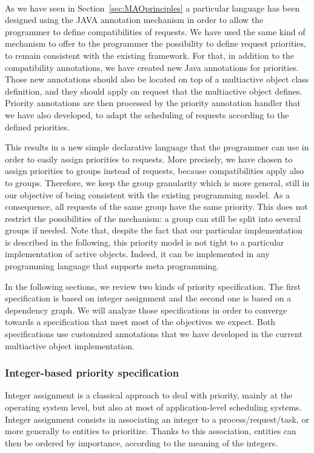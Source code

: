 \documentclass[11pt]{report}
\begin{document}
\paragraph{}
As we have seen in Section~\ref{sec:MAOprinciples} a particular language has been designed using the JAVA annotation mechanism in order to allow the programmer to define compatibilities of requests. We have used the same kind of mechanism to offer to the programmer the possibility to define request priorities, to remain consistent with the existing framework. For that, in addition to the compatibility annotations, we have created new Java annotations for priorities. Those new annotations should also be located on top of a multiactive object class definition, and they should apply on request that the multiactive object defines. 
Priority annotations are then processed by the priority annotation handler that we have also developed, to adapt the scheduling of requests according to the defined priorities.

This results in a new simple declarative language that the programmer can use in order to easily assign priorities to requests. More precisely, we have chosen to assign priorities to groups instead of requests, because compatibilities apply also to groups. Therefore, we keep the group granularity which is more general, still in our objective of being consistent with the existing programming model. As a consequence, all requests of the same group have the same priority. This does not restrict the possibilities of the mechanism: a group can still be split into several groups if needed.
Note that, despite the fact that our particular implementation is described in the following, this priority model is not tight to a particular implementation of active objects. Indeed, it can be implemented in any programming language that supports meta programming.

In the following sections, we review two kinds of priority specification. The first specification is based on integer assignment and the second one is based on a dependency graph. We will analyze those specifications in order to converge towards a specification that meet most of the objectives we expect. Both specifications use customized annotations that we have developed in the current multiactive object implementation. 

\subsubsection{Integer-based priority specification}
Integer assignment is a classical approach to deal with priority, mainly at the operating system level, but also at most of application-level scheduling systems. Integer assignment consists in associating an integer to a process/request/task, or more generally to entities to prioritize. Thanks to this association, entities can then be ordered by importance, according to the meaning of the integers.
\end{document}
